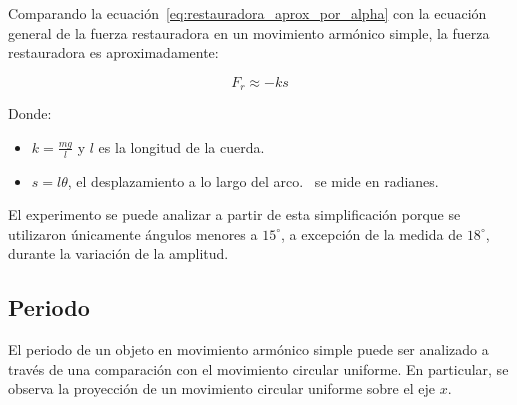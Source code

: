 \documentclass[twocolumn]{article}
\numberwithin{table}{section}
\begin{document}
Comparando la ecuación~\eqref{eq:restauradora_aprox_por_alpha} con la
ecuación general de la fuerza restauradora en un movimiento armónico
simple, la fuerza restauradora es aproximadamente:

\begin{equation}\label{eq:restauradora_mas}
  F_{r} \approx -ks
\end{equation}

Donde:

\begin{itemize}
  \item $k = \frac{mg}{l}$ y $l$ es la longitud de la cuerda.
  \item $s = l\theta$, el desplazamiento a lo largo del
    arco.\ \theta{} se mide en radianes.
\end{itemize}

El experimento se puede analizar a partir de esta simplificación
porque se utilizaron únicamente ángulos menores a $15^{\circ}$, a
excepción de la medida de $18^{\circ}$, durante la variación de la amplitud.

\subsection{Periodo}

El periodo de un objeto en movimiento armónico simple puede ser
analizado a través de una comparación con el movimiento circular
uniforme. En particular, se observa la proyección de un movimiento
circular uniforme sobre el eje $x$.
\end{document}
